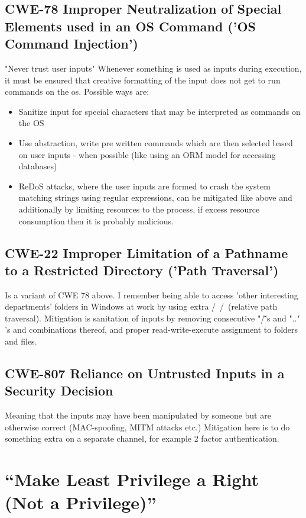 \documentclass[
	letterpaper, %
	10pt, %
	unnumberedsections, %
	twoside, %
]{LTJournalArticle}
\begin{document}
\subsection{CWE-78 Improper Neutralization of Special Elements used in an OS Command ('OS Command Injection')}
"Never trust user inputs" Whenever something is used as inputs during execution, it must be ensured that creative formatting of the input does not get to run commands on the os. Possible ways are:
\begin{itemize}
	\item Sanitize input for special characters that may be interpreted as commands on the OS
	\item Use abstraction, write pre written commands which are then selected based on user inputs - when possible (like using an ORM model for accessing databases) 
	\item ReDoS attacks, where the user inputs are formed to crash the system matching strings using regular expressions, can be mitigated like above and additionally by limiting resources to the process, if excess resource consumption then it is probably malicious.   
\end{itemize} 

\subsection{CWE-22 Improper Limitation of a Pathname to a Restricted Directory ('Path Traversal')}
Is a variant of CWE 78 above. I remember being able to access 'other interesting departments' folders in Windows at work by using extra /\ /\ (relative path traversal). Mitigation is sanitation of inputs by removing consecutive "/\" 's and ".." 's and combinations thereof, and proper read-write-execute assignment to folders and files. 

\subsection{CWE-807 Reliance on Untrusted Inputs in a Security Decision}
Meaning that the inputs may have been manipulated by someone but are otherwise correct (MAC-spoofing, MITM attacks etc.)
Mitigation here is to do something extra on a separate channel, for example 2 factor authentication.


\section{“Make Least Privilege a Right (Not a Privilege)”} 
\end{document}
